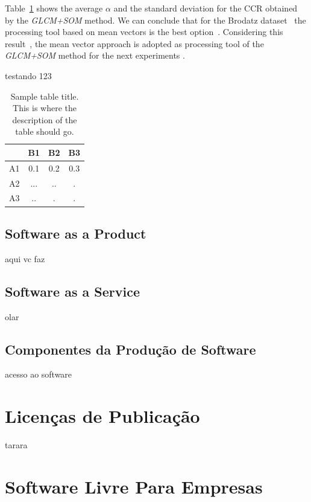 \documentclass{classe_cn}                 %
\begin{document}
Table~\ref{tag_tabela_01} shows the average $ \alpha $ and the standard deviation for the CCR \cite{Rosenfeld:1970} obtained by the \textit{GLCM+SOM} method. We can conclude that for the Brodatz dataset~\cite{Domingues:2010} the processing tool based on mean vectors is the best option~\cite{Rosenfeld:1970, Diday:1989}. Considering this result~\cite{Visible:2013}, the mean vector approach is adopted as processing tool of the \textit{GLCM+SOM} method for the next experiments \cite{Fulano:2009}.

testando 123

\begin{table}[h!]
\label{tag_tabela_01}
\caption{Sample table title. This is where the description of the table should go.}
  \begin{tabular}{cccc}
  \hline
       & B1   & B2   & B3   \\ \hline
   A1  & 0.1  & 0.2  & 0.3  \\
   A2  & ...  & ..   & .    \\
   A3  & ..   & .    & .    \\ \hline
  \end{tabular}
\end{table}

\subsection{Software as a Product}

aqui vc faz

\subsection{Software as a Service}

olar

\subsection{Componentes da Produção de Software}

acesso ao software

\section{Licenças de Publicação}

tarara

\section{Software Livre Para Empresas}
\end{document}
